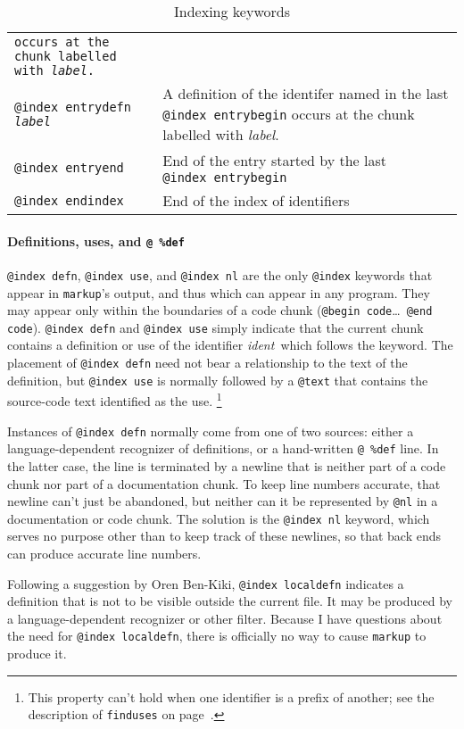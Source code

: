 \documentclass{article}
\makeatletter
\newcommand\kw[1]{\texttt{@#1}}
\newcommand\kws[2]{\kw{#1}\hbox{\thinspace}\ldots~\kw{#2}}
\newcommand\ikw[1]{\kw{index~#1}}
\newcommand\ltxlabel{\relax}
\let\ltxlabel=\label
\renewcommand\label{{\rm\it label\/}}
\newcommand\ident{{\rm\it ident\/}}
\makeatother
\begin{document}
\begin{table}
\begin{center}
\begin{tabularx}{\textwidth}{|>{\tt}l>{\raggedright\arraybackslash}X|}
        occurs at the chunk labelled with \label.\\
@index entrydefn \label&
        A definition of the identifer named in the last \ikw{entrybegin}
        occurs at the chunk labelled with \label.\\
@index entryend&
        End of the entry started by the last \ikw{entrybegin}\\
@index endindex&End of the index of identifiers\\
\hline
\end{tabularx}
\end{center}
\caption{Indexing keywords}
\ltxlabel{tab:index}
\vskip -5pt
\end{table}



\paragraph{Definitions, uses, and {\tt @ \%def}}

\ikw{defn}, \ikw{use}, and \ikw{nl} are the only
\kw{index} keywords that appear in {\tt markup}'s output, and thus
which can appear in any program.
They may appear only within the boundaries of a code chunk (\kws{begin
code}{end code}).
\ikw{defn} and \ikw{use} simply indicate that the current chunk
contains a definition or use of the identifier \ident\ which follows
the keyword.
The placement of \ikw{defn} need not bear a relationship to the
text of the definition, but \ikw{use} is normally followed by a
\kw{text} that contains the source-code text identified as the
use.%
\footnote{This property can't hold when one identifier is a prefix of
another; see the description of {\tt finduses} on page~\pageref{finduses}.}

Instances of \ikw{defn} normally come from one of two sources: either a
language-dependent recognizer of definitions, or a hand-written
\verb+@ %def+ line.
In the latter case, the line is terminated by a newline that is
neither part of a code chunk nor part of a documentation chunk.
To keep line numbers accurate, that newline can't just be abandoned,
but neither can it be represented by \kw{nl} in a documentation or
code chunk.
The solution is the \ikw{nl} keyword, which serves no purpose other
than to keep track of these newlines, so that back ends can produce
accurate line numbers.

Following a suggestion by Oren Ben-Kiki,
\ikw{localdefn} indicates a definition that is not to be visible
outside the current file.
It may be produced by a language-dependent recognizer or other filter.
Because I have questions about the need for \ikw{localdefn}, there is
officially no way to cause {\tt markup} to produce it.
\end{document}
